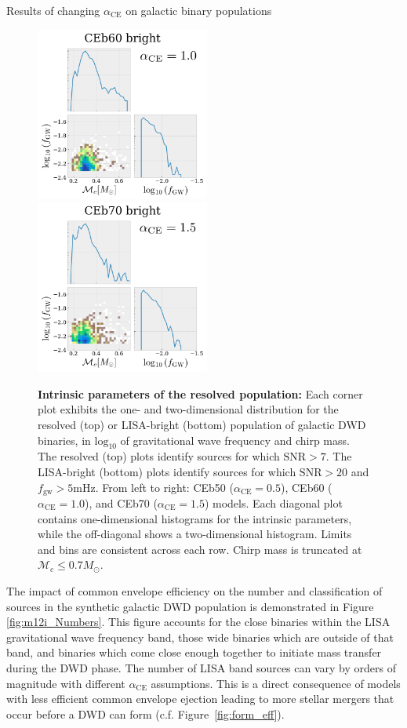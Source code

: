 \documentclass[twocolumn]{aastex631}
\newcommand*\mc{\mathcal{M}_c}
\newcommand*{\fgw}{f_{\mathrm{gw}}}
\newcommand*{\alphaCE}{\alpha_{\mathrm{CE}}}
\newcommand*{\msun}{M_{\odot}}
\begin{document}
\begin{subsection}{Results of changing $\alphaCE{}$ on galactic binary populations}
\begin{figure}
\includegraphics[width=2.250in]{CEb60_m12i_intrinsic_bright.png}
\includegraphics[width=2.250in]{CEb70_m12i_intrinsic_bright.png}
\caption{\label{fig:corner_intrinsic}
\textbf{Intrinsic parameters of the resolved population:}
    Each corner plot exhibits the one- and two-dimensional
        distribution for the resolved (top) or LISA-bright (bottom) population
        of galactic DWD binaries, in $\mathrm{log}_{10}$ of
        gravitational wave frequency and chirp mass.
    The resolved (top) plots identify sources for which $\mathrm{SNR} > 7$.
    The LISA-bright (bottom) plots identify sources for which
        $\mathrm{SNR} > 20$ and $\fgw > 5 \mathrm{mHz}$.
    From left to right: CEb50 ($\alphaCE = 0.5$),
        CEb60 ($\alphaCE = 1.0$), and CEb70 ($\alphaCE = 1.5$) models.
    Each diagonal plot contains one-dimensional histograms for the intrinsic parameters,
        while the off-diagonal shows a two-dimensional histogram.
    Limits and bins are consistent across each row.
    Chirp mass is truncated at $\mc \leq 0.7 \msun$.
}
\end{figure}

The impact of common envelope efficiency on 
    the number and classification of sources in the synthetic galactic DWD population
    is demonstrated in Figure \ref{fig:m12i_Numbers}.
This figure accounts for the close binaries within the LISA gravitational wave
    frequency band, those wide binaries which are outside of that band,
    and binaries which come close enough together to initiate 
    mass transfer during the DWD phase.
The number of LISA band sources can vary by orders of magnitude
    with different $\alphaCE{}$ assumptions. 
This is a direct consequence of models with less efficient common envelope ejection 
    leading to more stellar mergers that occur 
    before a DWD can form (c.f. Figure~\ref{fig:form_eff}).


\end{subsection}
\end{document}
